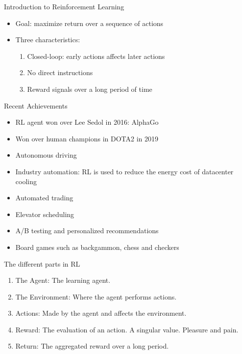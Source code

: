 \documentclass[10pt]{beamer}
\begin{document}
\begin{frame}{Introduction to Reinforcement Learning}

\begin{itemize}
\item {\color{uured} Goal}: maximize return over a sequence of actions\pause
\item Three characteristics:
\begin{enumerate}
\item Closed-loop: early actions affects later actions\pause
\item No direct instructions\pause
\item Reward signals over a long period of time
\end{enumerate}
\end{itemize}

\end{frame}



\begin{frame}{Recent Achievements}

\begin{itemize}
\item RL agent won over Lee Sedol in 2016: {\color{uured} AlphaGo}\pause
\item Won over human champions in {\color{uured} DOTA2} in 2019\pause
\item Autonomous driving\pause
\item Industry automation: RL is used to reduce the energy cost of datacenter cooling\pause
\item Automated trading\pause
\item Elevator scheduling\pause
\item A/B testing and personalized recommendations\pause
\item Board games such as backgammon, chess and checkers
\end{itemize}

\end{frame}



\begin{frame}{The different parts in RL}

\begin{enumerate}
\item The {\color{uured} Agent}: The learning agent. \pause
\item The {\color{uured} Environment}: Where the agent performs actions.\pause
\item {\color{uured} Actions}: Made by the agent and affects the environment.\pause
\item {\color{uured} Reward}: The evaluation of an action. A singular value. Pleasure and pain.\pause
\item {\color{uured} Return}: The aggregated reward over a long period.\pause
\end{enumerate}

\end{frame}
\end{document}
